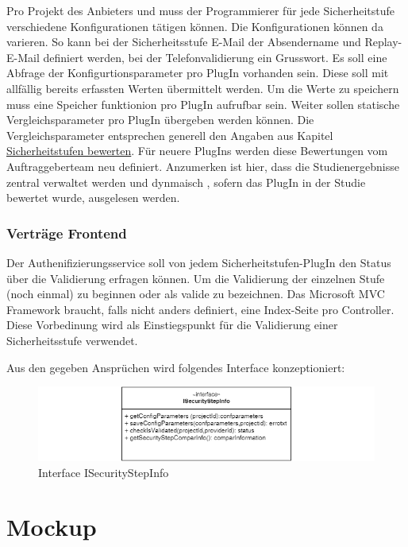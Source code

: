Pro Projekt des Anbieters und muss der Programmierer für jede
Sicherheitstufe verschiedene Konfigurationen tätigen können. Die
Konfigurationen können da varieren. So kann bei der Sicherheitsstufe
E-Mail der Absendername und Replay-E-Mail definiert werden, bei der
Telefonvalidierung ein Grusswort. Es soll eine Abfrage der
Konfigurtionsparameter pro PlugIn vorhanden sein. Diese soll mit
allfällig bereits erfassten Werten übermittelt werden. Um die Werte zu
speichern muss eine Speicher funktionion pro PlugIn aufrufbar sein.
Weiter sollen statische Vergleichsparameter pro PlugIn übergeben werden
können. Die Vergleichsparameter entsprechen generell den Angaben aus
Kapitel \protect\hyperlink{sicherheitstufen-bewerten}{Sicherheitstufen
bewerten}. Für neuere PlugIns werden diese Bewertungen vom
Auftraggeberteam neu definiert. Anzumerken ist hier, dass die
Studienergebnisse zentral verwaltet werden und dynmaisch , sofern das
PlugIn in der Studie bewertet wurde, ausgelesen werden.

\subsubsection{Verträge Frontend}\label{vertruxe4ge-frontend}

Der Authenifizierungsservice soll von jedem Sicherheitstufen-PlugIn den
Status über die Validierung erfragen können. Um die Validierung der
einzelnen Stufe (noch einmal) zu beginnen oder als valide zu bezeichnen.
Das Microsoft MVC Framework braucht, falls nicht anders definiert, eine
Index-Seite pro Controller. Diese Vorbedinung wird als Einstiegspunkt
für die Validierung einer Sicherheitsstufe verwendet.

Aus den gegeben Ansprüchen wird folgendes Interface konzeptioniert:

\begin{figure}[htbp]
\centering
\includegraphics{images/draw_io/ISecurityStepContract.png}
\caption{Interface ISecurityStepInfo}
\end{figure}

\newpage

\hypertarget{mockup}{\section{Mockup}\label{mockup}}

